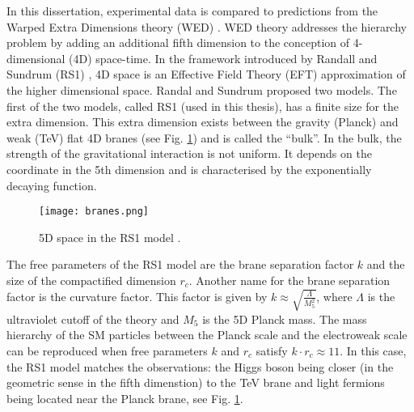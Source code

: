 In this dissertation, experimental data is compared to predictions from the Warped Extra Dimensions theory (WED) \cite{Oliveira:2014kla}. WED theory addresses the hierarchy problem by adding an additional fifth dimension to the conception of 4-dimensional (4D) space-time. In the framework introduced by Randall and Sundrum (RS1) \cite{Randall:1999ee}, 4D space is an Effective Field Theory (EFT) approximation of the higher dimensional space. Randal and Sundrum proposed two models. The first of the two models, called RS1 (used in this thesis), has a finite size for the extra dimension. This extra dimension exists between the gravity (Planck) and weak (TeV) flat 4D branes (see Fig. \ref{branes}) and is called the ``bulk''. In the bulk, the strength of the gravitational interaction is not uniform. It depends on the coordinate in the 5th dimension and is characterised by the exponentially decaying function.




\begin{figure}[H]
\centering
\texttt{[image: branes.png]}
\caption[RS1 branes]{5D space in the RS1 model \cite{Xanda}.}
\label{branes}
\end{figure}




The free parameters of the RS1 model are the brane separation factor $k$ and the size of the compactified dimension $r_c$. Another name for the brane separation factor is the curvature factor. This factor is given by $k \approx \sqrt{ \frac{\Lambda}{M^2_5}  }$, where $\Lambda$ is the ultraviolet cutoff of the theory and $M_5$ is the 5D Planck mass. %
The mass hierarchy of the SM particles between the Planck scale and the electroweak scale can be reproduced when free parameters $k$ and $r_c$ satisfy $k \cdot r_c \approx 11$. In this case, the RS1 model matches the observations: the Higgs boson being closer (in the geometric sense in the fifth dimenstion) to the TeV brane and light fermions being located near the Planck brane, see Fig. \ref{branes}.

